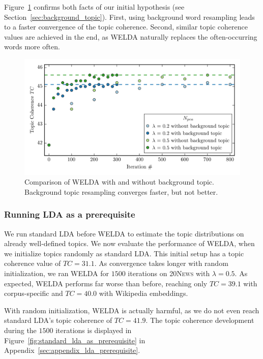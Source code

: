 \documentclass[
        a4paper,
        titlepage,
        twoside,
        parskip,
        numbers=noenddot
        ]{scrbook}
\theoremstyle{break}
\begin{document}
Figure~\ref{fig:welda_gaussian_background_topic} confirms both facts of our initial hypothesis (see Section~\ref{sec:background_topic}).
First, using background word resampling leads to a faster convergence of the topic coherence.
Second, similar topic coherence values are achieved in the end, as WELDA naturally replaces the often-occurring words more often.

\begin{figure}
       \centering
       \includegraphics[width=\textwidth]{figures/welda_gaussian_background_topic.png}
       \caption{Comparison of WELDA with and without background topic. Background topic resampling converges faster, but not better.}
       \label{fig:welda_gaussian_background_topic}
\end{figure}

\subsubsection{Running LDA as a prerequisite}

We run standard LDA before WELDA to estimate the topic distributions on already well-defined topics.
We now evaluate the performance of WELDA, when we initialize topics randomly as standard LDA.
This initial setup has a topic coherence value of $TC = 31.1$.
As convergence takes longer with random initialization, we ran WELDA for $1500$ iterations on \textsc{20News} with $\lambda = 0.5$.
As expected, WELDA performs far worse than before, reaching only $TC = 39.1$ with corpus-specific and $TC = 40.0$ with Wikipedia embeddings.



With random initialization, WELDA is actually harmful, as we do not even reach standard LDA's topic coherence of $TC = 41.9$.
The topic coherence development during the $1500$ iterations is displayed in Figure~\ref{fig:standard_lda_as_prerequisite} in Appendix~\ref{sec:appendix_lda_prerequisite}.
\end{document}

